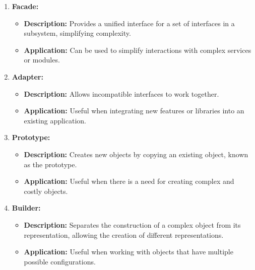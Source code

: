 \documentclass{article}
\begin{document}
\begin{enumerate}
    \item \textbf{Facade:}
        \begin{itemize}
            \item \textbf{Description:} Provides a unified interface for a set of interfaces in a subsystem, simplifying complexity.
            \item \textbf{Application:} Can be used to simplify interactions with complex services or modules.
        \end{itemize}

    \item \textbf{Adapter:}
        \begin{itemize}
            \item \textbf{Description:} Allows incompatible interfaces to work together.
            \item \textbf{Application:} Useful when integrating new features or libraries into an existing application.
        \end{itemize}

    \item \textbf{Prototype:}
        \begin{itemize}
            \item \textbf{Description:} Creates new objects by copying an existing object, known as the prototype.
            \item \textbf{Application:} Useful when there is a need for creating complex and costly objects.
        \end{itemize}

    \item \textbf{Builder:}
        \begin{itemize}
            \item \textbf{Description:} Separates the construction of a complex object from its representation, allowing the creation of different representations.
            \item \textbf{Application:} Useful when working with objects that have multiple possible configurations.
        \end{itemize}

\end{enumerate}
\end{document}

